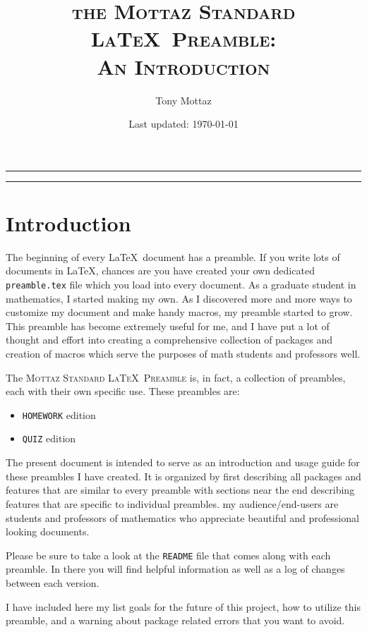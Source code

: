 \documentclass[letterpaper,12pt]{article}
\title{\vspace{-0.75in} \scshape the Mottaz Standard \LaTeX\ Preamble: \\ {\Large An Introduction} \vspace{-0.5\baselineskip}}
\author{Tony Mottaz}
\date{\vspace*{-0.5\baselineskip} Last updated: \today}
\begin{document}
\thispagestyle{plain}
\maketitle
\vspace*{-30pt}
\begin{center}
\rule{0.9\textwidth}{2pt}
\vspace*{-10pt}
\rule{0.8\textwidth}{1pt}
\end{center}
\tableofcontents

\newpage
\section{Introduction}
The beginning of every \LaTeX\ document has a preamble. If you write lots of documents in \LaTeX , chances are you have created your own dedicated \texttt{preamble.tex} file which you load into every document. As a graduate student in mathematics, I started making my own. As I discovered more and more ways to customize my document and make handy macros, my preamble started to grow. This preamble has become extremely useful for me, and I have put a lot of thought and effort into creating a comprehensive collection of packages and creation of macros which serve the purposes of math students and professors well.

The \textsc{Mottaz Standard \LaTeX\ Preamble} is, in fact, a collection of preambles, each with their own specific use. These preambles are:

\begin{itemize}
	\item \texttt{HOMEWORK} edition
	\item \texttt{QUIZ} edition
\end{itemize}

The present document is intended to serve as an introduction and usage guide for these preambles I have created. It is organized by first describing all packages and features that are similar to every preamble with sections near the end describing features that are specific to individual preambles. my audience/end-users are students and professors of mathematics who appreciate beautiful and professional looking documents.

Please be sure to take a look at the \texttt{README} file that comes along with each preamble. In there you will find helpful information as well as a log of changes between each version.

I have included here my list goals for the future of this project, how to utilize this preamble, and a warning about package related errors that you want to avoid.
\end{document}
